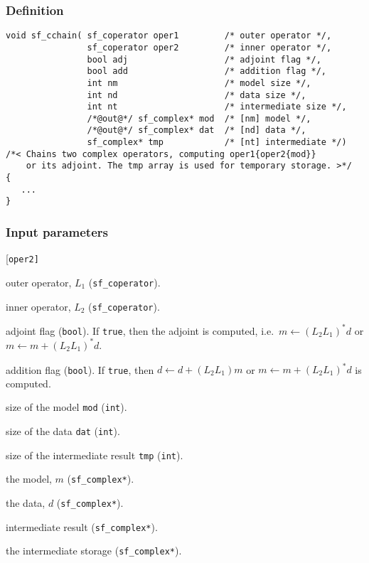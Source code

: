 \subsubsection*{Definition}
\begin{verbatim}
void sf_cchain( sf_coperator oper1         /* outer operator */, 
                sf_coperator oper2         /* inner operator */, 
                bool adj                   /* adjoint flag */, 
                bool add                   /* addition flag */, 
                int nm                     /* model size */, 
                int nd                     /* data size */, 
                int nt                     /* intermediate size */, 
                /*@out@*/ sf_complex* mod  /* [nm] model */, 
                /*@out@*/ sf_complex* dat  /* [nd] data */, 
                sf_complex* tmp            /* [nt] intermediate */) 
/*< Chains two complex operators, computing oper1{oper2{mod}} 
    or its adjoint. The tmp array is used for temporary storage. >*/
{
   ...    
}
\end{verbatim}

\subsubsection*{Input parameters}
\begin{desclist}{\tt }{\quad}[\tt oper2]
   \setlength\itemsep{0pt}
   \item[oper1] outer operator, $L_1$ (\texttt{sf\_coperator}). 
   \item[oper2] inner operator, $L_2$ (\texttt{sf\_coperator}). 
   \item[adj] adjoint flag (\texttt{bool}). If \texttt{true}, then the adjoint is computed, i.e.~$m\leftarrow (L_2L_1)^*d$ or $m\leftarrow m+(L_2L_1)^*d$. 
   \item[add] addition flag (\texttt{bool}). If \texttt{true}, then $d\leftarrow d+(L_2L_1)m$ or $m\leftarrow m+(L_2L_1)^*d$ is computed.  
   \item[nm]    size of the model \texttt{mod} (\texttt{int}). 
   \item[nd]    size of the data \texttt{dat} (\texttt{int}). 
   \item[nt]    size of the intermediate result \texttt{tmp}  (\texttt{int}). 
   \item[mod]   the model, $m$ (\texttt{sf\_complex*}).
   \item[dat]   the data, $d$ (\texttt{sf\_complex*}).
   \item[tmp]   intermediate result (\texttt{sf\_complex*}).
   \item[tmp]   the intermediate storage (\texttt{sf\_complex*}).
\end{desclist}




